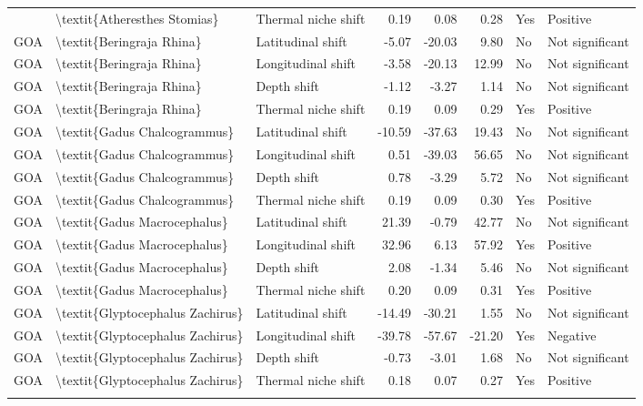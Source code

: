 \begin{longtable}[t]{lllrrrll}
{{\addlinespace
GOA & \textbackslash{}textit\{Atheresthes Stomias\} & Thermal niche shift & 0.19 & 0.08 & 0.28 & Yes & Positive\\
GOA & \textbackslash{}textit\{Beringraja Rhina\} & Latitudinal shift & -5.07 & -20.03 & 9.80 & No & Not significant\\
GOA & \textbackslash{}textit\{Beringraja Rhina\} & Longitudinal shift & -3.58 & -20.13 & 12.99 & No & Not significant\\
GOA & \textbackslash{}textit\{Beringraja Rhina\} & Depth shift & -1.12 & -3.27 & 1.14 & No & Not significant\\
GOA & \textbackslash{}textit\{Beringraja Rhina\} & Thermal niche shift & 0.19 & 0.09 & 0.29 & Yes & Positive\\
\addlinespace
GOA & \textbackslash{}textit\{Gadus Chalcogrammus\} & Latitudinal shift & -10.59 & -37.63 & 19.43 & No & Not significant\\
GOA & \textbackslash{}textit\{Gadus Chalcogrammus\} & Longitudinal shift & 0.51 & -39.03 & 56.65 & No & Not significant\\
GOA & \textbackslash{}textit\{Gadus Chalcogrammus\} & Depth shift & 0.78 & -3.29 & 5.72 & No & Not significant\\
GOA & \textbackslash{}textit\{Gadus Chalcogrammus\} & Thermal niche shift & 0.19 & 0.09 & 0.30 & Yes & Positive\\
GOA & \textbackslash{}textit\{Gadus Macrocephalus\} & Latitudinal shift & 21.39 & -0.79 & 42.77 & No & Not significant\\
\addlinespace
GOA & \textbackslash{}textit\{Gadus Macrocephalus\} & Longitudinal shift & 32.96 & 6.13 & 57.92 & Yes & Positive\\
GOA & \textbackslash{}textit\{Gadus Macrocephalus\} & Depth shift & 2.08 & -1.34 & 5.46 & No & Not significant\\
GOA & \textbackslash{}textit\{Gadus Macrocephalus\} & Thermal niche shift & 0.20 & 0.09 & 0.31 & Yes & Positive\\
GOA & \textbackslash{}textit\{Glyptocephalus Zachirus\} & Latitudinal shift & -14.49 & -30.21 & 1.55 & No & Not significant\\
GOA & \textbackslash{}textit\{Glyptocephalus Zachirus\} & Longitudinal shift & -39.78 & -57.67 & -21.20 & Yes & Negative\\
\addlinespace
GOA & \textbackslash{}textit\{Glyptocephalus Zachirus\} & Depth shift & -0.73 & -3.01 & 1.68 & No & Not significant\\
GOA & \textbackslash{}textit\{Glyptocephalus Zachirus\} & Thermal niche shift & 0.18 & 0.07 & 0.27 & Yes & Positive\\
}}
\end{longtable}
